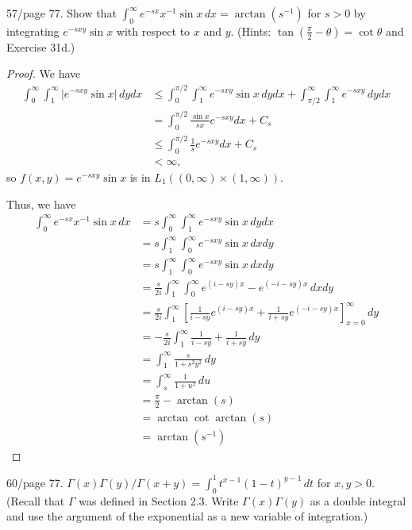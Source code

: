 \documentclass{article}
\begin{document}
 57/page 77. Show that $\int_0^\infty e^{-sx}x^{-1} \sin x \, dx = \arctan(s^{-1})$ for $s > 0$ by integrating $e^{-sxy}\sin x$ with respect to $x$ and $y$.  (Hints: $\tan(\frac \pi 2 - \theta) = \cot \theta$ and Exercise 31d.) %
\begin{proof}
We have
\begin{align*}
\int_0^\infty \int_1^\infty \left| e^{-sxy} \sin x \right| \, dy dx  & \le \int_0^{\pi/2} \int_1^\infty e^{-sxy} \sin x \, dy dx + \int_{\pi/2}^{\infty} \int_1^\infty e^{-sxy} \, dy dx
\\ & = \int_0^{\pi/2}  \frac {\sin x} {sx} e^{-sxy}  dx   + C_s
\\ & \le \int_0^{\pi/2}  \frac 1 s e^{-sxy}  dx   + C_s
\\ & < \infty,
\end{align*}
so  $f(x,y) =  e^{-sxy} \sin x$ is in $L_1((0,\infty) \times (1,\infty))$.

Thus, we have
\begin{align*}
\int_0^\infty  e^{-sx} x^{-1} \sin x \, dx & =  s \int_0^\infty \int_1^\infty e^{-sxy} \sin x \, dy dx 
\\ & =  s \int_1^\infty \int_0^\infty e^{-sxy} \sin x \, dx dy
\\ & =  s \int_1^\infty \int_0^\infty e^{-sxy} \sin x \, dx dy
\\ & =  \frac s {2i} \int_1^\infty \int_0^\infty e^{(i-sy)x} - e^{(-i-sy)x} \, dx dy
\\ & =  \frac s {2i} \int_1^\infty \left[\frac 1 {i - sy} e^{(i-sy)x} + \frac 1 {i + sy} e^{(-i-sy)x} \right]_{x = 0}^\infty \,  dy
\\ & =  - \frac s {2i} \int_1^\infty \frac 1 {i - sy} + \frac 1 {i + sy}  \,  dy
\\ & =   \int_1^\infty \frac s {1 + s^2y^2}  \,  dy
\\ & =   \int_{s}^\infty \frac 1 {1 + u^2}  \,  du
\\ & = \frac \pi 2 - \arctan(s) 
\\ & = \arctan \cot \arctan(s) 
\\ & = \arctan (s^{-1}) 
\end{align*}
\end{proof}

 60/page 77. $\Gamma(x) \Gamma(y)/ \Gamma(x + y) = \int_0^1 t^{x-1}(1-t)^{y-1} \, dt$ for $x,y > 0$. (Recall that $\Gamma$ was defined in Section 2.3. Write $\Gamma(x) \Gamma(y)$ as a double integral and use the argument of the exponential as a new variable of integration.)
\end{document}
